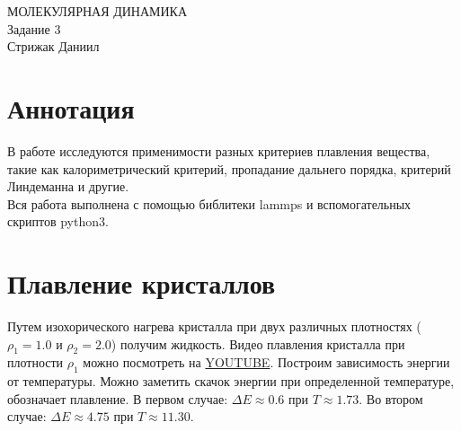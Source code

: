 



\renewcommand{\thesection}{\alph{section}}





\maketitle
\begin{center}
\LARGE{МОЛЕКУЛЯРНАЯ ДИНАМИКА}\\
    \Large{Задание 3}\\
    Стрижак Даниил
\end{center}
\tableofcontents
\newpage

\section*{Аннотация}

В работе исследуются применимости разных критериев плавления вещества, такие как калориметрический критерий, пропадание дальнего порядка, критерий Линдеманна и другие. \\
Вся работа выполнена с помощью библитеки lammps и вспомогательных скриптов python3. 

\section{Плавление кристаллов}

Путем изохорического нагрева кристалла при двух различных плотностях ($\rho_1 = 1.0 $ и $\rho_2 = 2.0$) получим жидкость. Видео плавления кристалла при плотности $\rho_1$ можно посмотреть на \href{https://youtu.be/tzXEO91IEJA}{YOUTUBE}. Построим зависимость энергии от температуры. Можно заметить скачок энергии при определенной температуре, обозначает плавление. В первом случае: $\Delta E \approx 0.6 $ при $T \approx 1.73$. Во втором случае: $\Delta E \approx 4.75$ при $T \approx 11.30$. 


